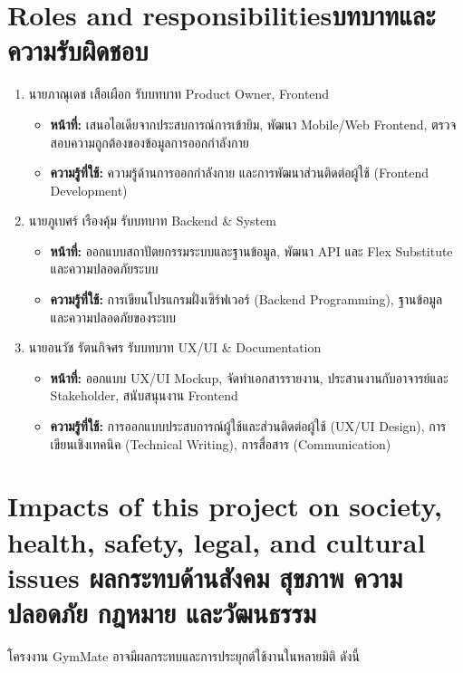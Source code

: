 \section{\ifenglish Roles and responsibilities\else บทบาทและความรับผิดชอบ\fi}
\begin{enumerate}
    \item นายภาณุเดช เสือเผือก รับบทบาท Product Owner, Frontend
    \begin{itemize}
        \item \textbf{หน้าที่:} เสนอไอเดียจากประสบการณ์การเข้ายิม, พัฒนา Mobile/Web Frontend, ตรวจสอบความถูกต้องของข้อมูลการออกกำลังกาย
        \item \textbf{ความรู้ที่ใช้:} ความรู้ด้านการออกกำลังกาย และการพัฒนาส่วนติดต่อผู้ใช้ (Frontend Development)
    \end{itemize}

    \item นายภูเบศร์ เรืองคุ้ม รับบทบาท Backend \& System
    \begin{itemize}
        \item \textbf{หน้าที่:} ออกแบบสถาปัตยกรรมระบบและฐานข้อมูล, พัฒนา API และ Flex Substitute และความปลอดภัยระบบ
        \item \textbf{ความรู้ที่ใช้:} การเขียนโปรแกรมฝั่งเซิร์ฟเวอร์ (Backend Programming), ฐานข้อมูล และความปลอดภัยของระบบ
    \end{itemize}

    \item นายอนวัช รัตนกิจศร รับบทบาท UX/UI \& Documentation
    \begin{itemize}
        \item \textbf{หน้าที่:} ออกแบบ UX/UI Mockup, จัดทำเอกสารรายงาน, ประสานงานกับอาจารย์และ Stakeholder, สนับสนุนงาน Frontend
        \item \textbf{ความรู้ที่ใช้:} การออกแบบประสบการณ์ผู้ใช้และส่วนติดต่อผู้ใช้ (UX/UI Design), การเขียนเชิงเทคนิค (Technical Writing), การสื่อสาร (Communication)
    \end{itemize}
\end{enumerate}

\section{\ifenglish%
Impacts of this project on society, health, safety, legal, and cultural issues
\else%
ผลกระทบด้านสังคม สุขภาพ ความปลอดภัย กฎหมาย และวัฒนธรรม
\fi}

\enskip โครงงาน GymMate อาจมีผลกระทบและการประยุกต์ใช้งานในหลายมิติ ดังนี้

